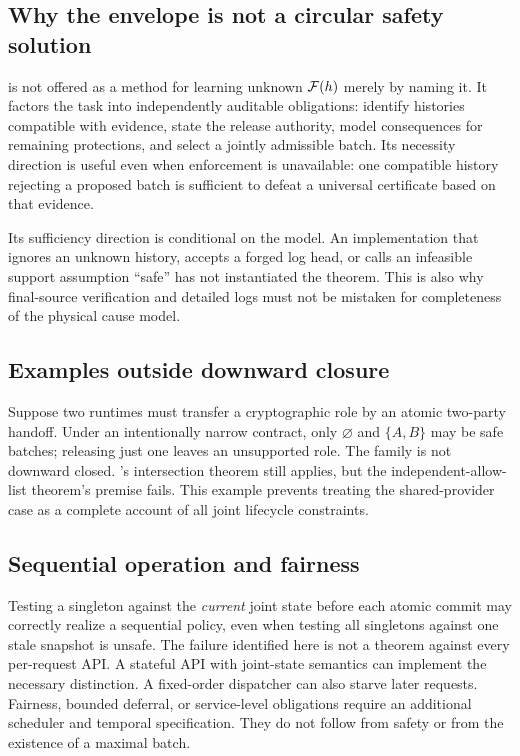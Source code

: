 \subsection{Why the envelope is not a circular safety solution}
 is not offered as a method for learning unknown $\mathcal F(h)$ merely by naming it. It factors the task into independently auditable obligations: identify histories compatible with evidence, state the release authority, model consequences for remaining protections, and select a jointly admissible batch. Its necessity direction is useful even when enforcement is unavailable: one compatible history rejecting a proposed batch is sufficient to defeat a universal certificate based on that evidence.

Its sufficiency direction is conditional on the model. An implementation that ignores an unknown history, accepts a forged log head, or calls an infeasible support assumption ``safe'' has not instantiated the theorem. This is also why final-source verification and detailed logs must not be mistaken for completeness of the physical cause model.

\subsection{Examples outside downward closure}
Suppose two runtimes must transfer a cryptographic role by an atomic two-party handoff. Under an intentionally narrow contract, only $\varnothing$ and $\{A,B\}$ may be safe batches; releasing just one leaves an unsupported role. The family is not downward closed. 's intersection theorem still applies, but the independent-allow-list theorem's premise fails. This example prevents treating the shared-provider case as a complete account of all joint lifecycle constraints.

\subsection{Sequential operation and fairness}
Testing a singleton against the \emph{current} joint state before each atomic commit may correctly realize a sequential policy, even when testing all singletons against one stale snapshot is unsafe. The failure identified here is not a theorem against every per-request API. A stateful API with joint-state semantics can implement the necessary distinction. A fixed-order dispatcher can also starve later requests. Fairness, bounded deferral, or service-level obligations require an additional scheduler and temporal specification. They do not follow from safety or from the existence of a maximal batch.


